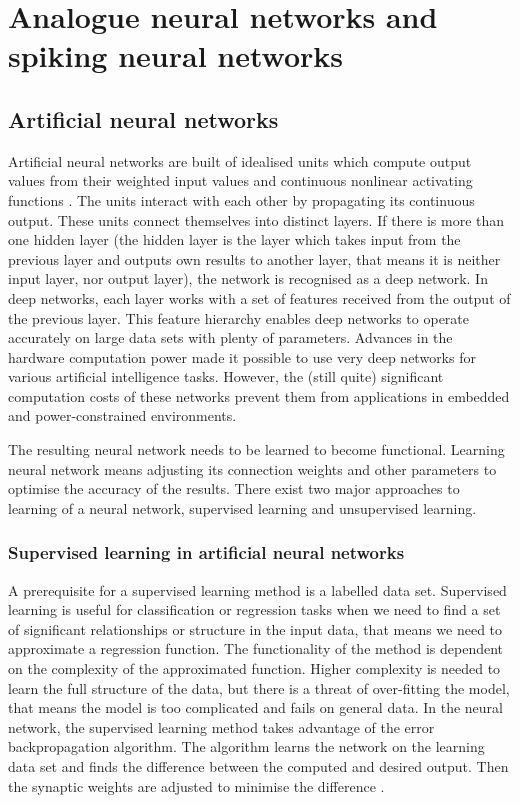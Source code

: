 \chapter{Analogue neural networks and spiking neural networks} \label{chap:02}

\section{Artificial neural networks}
Artificial neural networks are built of idealised units which compute output values from their weighted input values and continuous nonlinear activating functions \cite{tavanaeiDeepLearningSpiking2019}. The units interact with each other by propagating its continuous output. These units connect themselves into distinct layers. If there is more than one hidden layer (the hidden layer is the layer which takes input from the previous layer and outputs own results to another layer, that means it is neither input layer, nor output layer), the network is recognised as a deep network. In deep networks, each layer works with a set of features received from the output of the previous layer. This feature hierarchy enables deep networks to operate accurately on large data sets with plenty of parameters. Advances in the hardware computation power made it possible to use very deep networks for various artificial intelligence tasks. However, the (still quite) significant computation costs of these networks prevent them from applications in embedded and power-constrained environments. \par
The resulting neural network needs to be learned to become functional. Learning neural network means adjusting its connection weights and other parameters to optimise the accuracy of the results. There exist two major approaches to learning of a neural network, supervised learning and unsupervised learning.

\subsection{Supervised learning in artificial neural networks}
A prerequisite for a supervised learning method is a labelled data set. Supervised learning is useful for classification or regression tasks when we need to find a set of significant relationships or structure in the input data, that means we need to approximate a regression function. The functionality of the method is dependent on the complexity of the approximated function. Higher complexity is needed to learn the full structure of the data, but there is a threat of over-fitting the model, that means the model is too complicated and fails on general data. In the neural network, the supervised learning method takes advantage of the error backpropagation algorithm. The algorithm learns the network on the learning data set and finds the difference between the computed and desired output. Then the synaptic weights are adjusted to minimise the difference \cite{sathyaComparisonSupervisedUnsupervised2013}.

